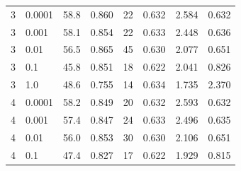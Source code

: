 \documentclass[12pt]{jarticle}
\numberwithin{equation}{section}    %
\numberwithin{figure}{section}      %
\numberwithin{table}{section}      %
\begin{document}
\begin{table}[bt]
\begin{center}
{\begin{tabular}{|c|l|rrrrrr|}
                \hline
                3                        & 0.0001                                   & 58.8                         & 0.860                     & 22                         & 0.632                         & 2.584                             & 0.632                    \\
                3                        & 0.001                                    & 58.1                         & 0.854                     & 22                         & 0.633                         & 2.448                             & 0.636                    \\
                3                        & 0.01                                     & 56.5                         & 0.865                     & 45                         & 0.630                         & 2.077                             & 0.651                    \\
                3                        & 0.1                                      & 45.8                         & 0.851                     & 18                         & 0.622                         & 2.041                             & 0.826                    \\
                3                        & 1.0                                      & 48.6                         & 0.755                     & 14                         & 0.634                         & 1.735                             & 2.370                    \\
                \hline
                4                        & 0.0001                                   & 58.2                         & 0.849                     & 20                         & 0.632                         & 2.593                             & 0.632                    \\
                4                        & 0.001                                    & 57.4                         & 0.847                     & 24                         & 0.633                         & 2.496                             & 0.635                    \\
                4                        & 0.01                                     & 56.0                         & 0.853                     & 30                         & 0.630                         & 2.106                             & 0.651                    \\
                4                        & 0.1                                      & 47.4                         & 0.827                     & 17                         & 0.622                         & 1.929                             & 0.815                    \\

\end{tabular}}
\end{center}
\end{table}
\end{document}
